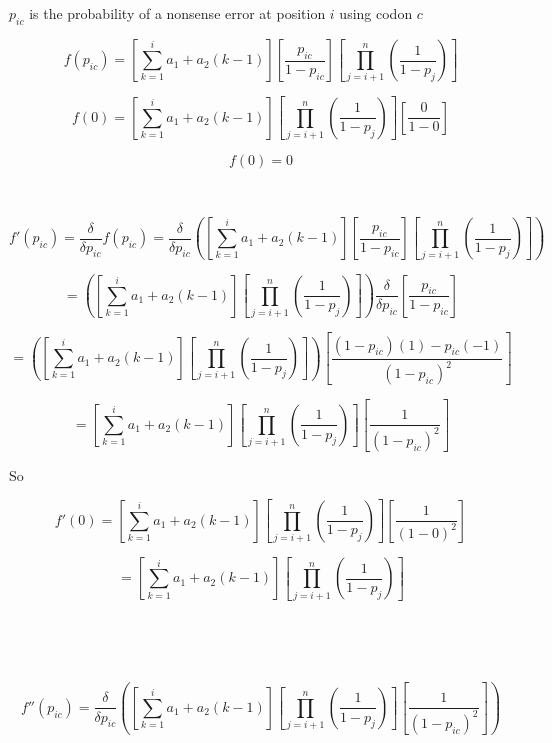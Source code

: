 \documentclass[11pt]{article} %
\begin{document}



$p_{ic}$ is the probability of a nonsense error at position $i$ using codon $c$

$$f(p_{ic})=
\left[\sum_{k=1}^{i} a_1 + a_2(k-1)\right]
\left[\frac{p_{ic}}{1-p_{ic}}\right]
\left[\prod_{j=i+1}^{n}(\frac{1}{1-p_{j}})\right]$$

$$
f(0)=
\left[\sum_{k=1}^{i} a_1 + a_2(k-1)\right]
\left[\prod_{j=i+1}^{n}(\frac{1}{1-p_{j}})\right]
\left[\frac{0}{1-0}\right]$$

$$f(0)=0$$


\noindent\makebox[\linewidth]{\rule{\textwidth}{1pt}} 

~

$$f'(p_{ic}) = \frac{\delta}{\delta p_{ic}}f(p_{ic})=
\frac{\delta}{\delta p_{ic}}\left(
\left[\sum_{k=1}^{i} a_1 + a_2(k-1)\right]
\left[\frac{p_{ic}}{1-p_{ic}}\right]
\left[\prod_{j=i+1}^{n}(\frac{1}{1-p_{j}})\right]
\right)$$

$$=
\left(
\left[\sum_{k=1}^{i} a_1 + a_2(k-1)\right]
\left[\prod_{j=i+1}^{n}(\frac{1}{1-p_{j}})\right]
\right)
\frac{\delta}{\delta p_{ic}}
\left[\frac{p_{ic}}{1-p_{ic}}\right]
$$

$$=
\left(
\left[\sum_{k=1}^{i} a_1 + a_2(k-1)\right]
\left[\prod_{j=i+1}^{n}(\frac{1}{1-p_{j}})\right]
\right)
\left[\frac{(1-p_{ic})(1) - p_{ic}(-1)}
{(1-p_{ic})^2}\right]
$$

$$=
\left[\sum_{k=1}^{i} a_1 + a_2(k-1)\right]
\left[\prod_{j=i+1}^{n}(\frac{1}{1-p_{j}})\right]
\left[\frac{1}
{(1-p_{ic})^2}\right]
$$

So

$$f'(0)=
\left[\sum_{k=1}^{i} a_1 + a_2(k-1)\right]
\left[\prod_{j=i+1}^{n}(\frac{1}{1-p_{j}})\right]
\left[\frac{1}
{(1-0)^2}\right]
$$

$$=
\left[\sum_{k=1}^{i} a_1 + a_2(k-1)\right]
\left[\prod_{j=i+1}^{n}(\frac{1}{1-p_{j}})\right]
$$

~

\noindent\makebox[\linewidth]{\rule{\textwidth}{1pt}} 

~

$$f''(p_{ic})=
\frac{\delta}{\delta p_{ic}}\left(
\left[\sum_{k=1}^{i} a_1 + a_2(k-1)\right]
\left[\prod_{j=i+1}^{n}(\frac{1}{1-p_{j}})\right]
\left[\frac{1}
{(1-p_{ic})^2}\right]
\right)
$$
\end{document}
